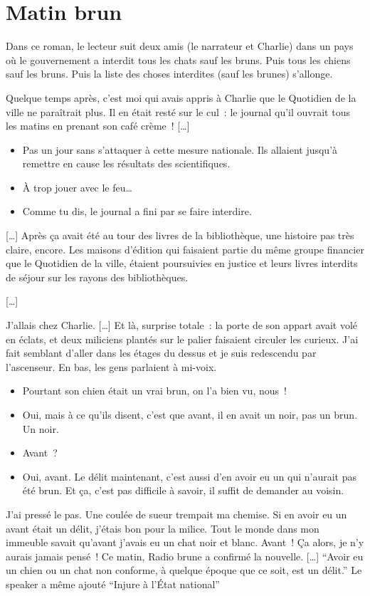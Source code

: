 \section{Matin brun}
\begin{em}
Dans ce roman, le lecteur suit deux amis (le narrateur et Charlie) dans un pays où le gouvernement a interdit tous les chats sauf les bruns. Puis tous les chiens sauf les bruns. Puis la liste des choses interdites (sauf les brunes) s'allonge.
\end{em}

Quelque temps après, c'est moi qui avais appris à Charlie que le Quotidien de la ville ne paraîtrait plus. Il en était resté sur le cul : le journal qu'il ouvrait tous les matins en prenant son café crème ! […]
\begin{itemize}
  \item Pas un jour sans s'attaquer à cette mesure nationale. Ils allaient jusqu'à remettre en cause les résultats des scientifiques. %
  \item À trop jouer avec le feu\ldots
  \item Comme tu dis, le journal a fini par se faire interdire.
\end{itemize}
[…]
Après ça avait été au tour des livres de la bibliothèque, une histoire pas très claire, encore.
Les maisons d'édition qui faisaient partie du même groupe financier que le Quotidien de la ville, étaient poursuivies en justice et leurs livres interdits de séjour sur les rayons des bibliothèques.

[…]

J'allais chez Charlie.
[…] Et là, surprise totale : la porte de son appart avait volé en éclats, et deux miliciens plantés sur le palier faisaient circuler les curieux.
J'ai fait semblant d'aller dans les étages du dessus et je suis redescendu par l'ascenseur.
En bas, les gens parlaient à mi-voix.
\begin{itemize}
  \item Pourtant son chien était un vrai brun, on l'a bien vu, nous !
  \item Oui, mais à ce qu'ils disent, c'est que avant, il en avait un noir, pas un brun. Un noir.
  \item Avant ?
  \item Oui, avant. Le délit maintenant, c'est aussi d'en avoir eu un qui n'aurait pas été brun. Et ça, c'est pas difficile à savoir, il suffit de demander au voisin.
\end{itemize}
J'ai pressé le pas. Une coulée de sueur trempait ma chemise. Si en avoir eu un avant était un délit, j'étais bon pour la milice. Tout le monde dans mon immeuble savait qu'avant j'avais eu un chat noir et blanc. Avant ! Ça alors, je n'y aurais jamais pensé ! Ce matin, Radio brune a confirmé la nouvelle. […]
\enquote{Avoir eu un chien ou un chat non conforme, à quelque époque que ce soit, est un délit.} Le speaker a même ajouté \enquote{Injure à l'État national} 

